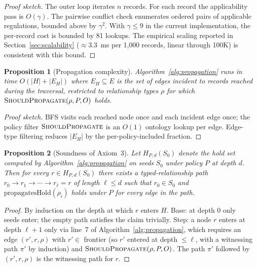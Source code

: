 \documentclass{ieeeaccess}
\newtheorem{proposition}{Proposition}
\begin{document}
\begin{proof}[Proof sketch]
The outer loop iterates $n$ records. For each record the applicability pass is $O(\gamma)$. The pairwise conflict check enumerates ordered pairs of applicable regulations, bounded above by $\gamma^2$. With $\gamma \leq 9$ in the current implementation, the per-record cost is bounded by 81 lookups. The empirical scaling reported in Section~\ref{sec:scalability} ($\approx 3.3$~ms per 1{,}000 records, linear through 100K) is consistent with this bound.
\end{proof}

\begin{proposition}[Propagation complexity]
Algorithm~\ref{alg:propagation} runs in time $O(|H| + |E_H|)$ where $E_H \subseteq E$ is the set of edges incident to records reached during the traversal, restricted to relationship types $\rho$ for which $\textsc{ShouldPropagate}(\rho, P, O)$ holds.
\end{proposition}

\begin{proof}[Proof sketch]
BFS visits each reached node once and each incident edge once; the policy filter $\textsc{ShouldPropagate}$ is an $O(1)$ ontology lookup per edge. Edge-type filtering reduces $|E_H|$ by the per-policy-included fraction.
\end{proof}

\begin{proposition}[Soundness of Axiom~3]
Let $H_{P,d}(S_0)$ denote the hold set computed by Algorithm~\ref{alg:propagation} on seeds $S_0$ under policy $P$ at depth $d$. Then for every $r \in H_{P,d}(S_0)$ there exists a typed-relationship path $r_0 \to r_1 \to \cdots \to r_\ell = r$ of length $\ell \leq d$ such that $r_0 \in S_0$ and $\mathrm{propagatesHold}(\rho_i)$ holds under $P$ for every edge in the path.
\end{proposition}

\begin{proof}
By induction on the depth at which $r$ enters $H$. Base: at depth 0 only seeds enter; the empty path satisfies the claim trivially. Step: a node $r$ enters at depth $\ell + 1$ only via line~7 of Algorithm~\ref{alg:propagation}, which requires an edge $(r', r, \rho)$ with $r' \in$ frontier (so $r'$ entered at depth $\leq \ell$, with a witnessing path $\pi'$ by induction) and $\textsc{ShouldPropagate}(\rho, P, O)$. The path $\pi'$ followed by $(r', r, \rho)$ is the witnessing path for $r$.
\end{proof}
\end{document}
